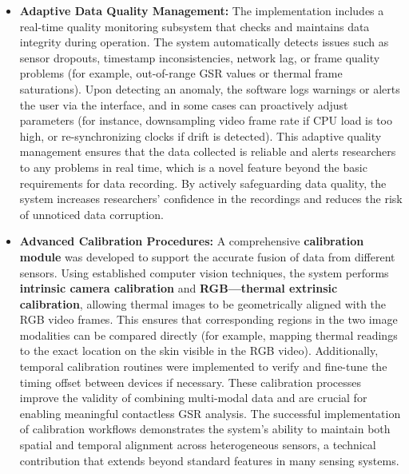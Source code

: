 \begin{itemize}
\item \textbf{Adaptive Data Quality Management:} The implementation includes a
  real-time quality monitoring subsystem that checks and maintains data
  integrity during operation. The system automatically detects issues
  such as sensor dropouts, timestamp inconsistencies, network lag, or
  frame quality problems (for example, out-of-range GSR values or
  thermal frame saturations). Upon detecting an anomaly, the software
  logs warnings or alerts the user via the interface, and in some cases
  can proactively adjust parameters (for instance, downsampling video
  frame rate if CPU load is too high, or re-synchronizing clocks if
  drift is detected). This adaptive quality management ensures that the
  data collected is reliable and alerts researchers to any problems in
  real time, which is a novel feature beyond the basic requirements for
  data recording. By actively safeguarding data quality, the system
  increases researchers' confidence in the recordings and reduces the
  risk of unnoticed data corruption.

\item \textbf{Advanced Calibration Procedures:} A comprehensive \textbf{calibration
  module} was developed to support the accurate fusion of data from
  different sensors. Using established computer vision techniques, the
  system performs \textbf{intrinsic camera calibration} and \textbf{RGB---thermal
  extrinsic calibration}, allowing thermal images to be geometrically
  aligned with the RGB video frames. This ensures that corresponding
  regions in the two image modalities can be compared directly (for
  example, mapping thermal readings to the exact location on the skin
  visible in the RGB video). Additionally, temporal calibration routines
  were implemented to verify and fine-tune the timing offset between
  devices if necessary. These calibration processes improve the validity
  of combining multi-modal data and are crucial for enabling meaningful
  contactless GSR analysis. The successful implementation of calibration
  workflows demonstrates the system's ability to maintain both spatial
  and temporal alignment across heterogeneous sensors, a technical
  contribution that extends beyond standard features in many sensing
  systems.


\end{itemize}
